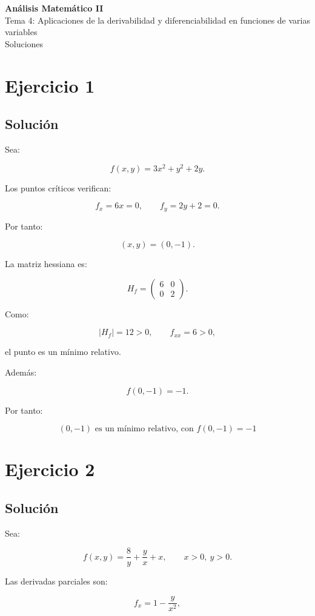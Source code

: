 \documentclass[11pt,a4paper]{article}
\begin{document}
\begin{center}
{\LARGE\bfseries Análisis Matemático II}\\[0.4em]
{\Large Tema 4: Aplicaciones de la derivabilidad y diferenciabilidad en funciones de varias variables}\\[0.4em]
{\large Soluciones}
\end{center}

\section{Ejercicio 1}
\subsection{Solución}

Sea:

\[
f(x,y)=3x^2+y^2+2y.
\]

Los puntos críticos verifican:

\[
f_x=6x=0,
\qquad
f_y=2y+2=0.
\]

Por tanto:

\[
(x,y)=(0,-1).
\]

La matriz hessiana es:

\[
H_f=
\begin{pmatrix}
6&0\\
0&2
\end{pmatrix}.
\]

Como:

\[
|H_f|=12>0,
\qquad
f_{xx}=6>0,
\]

el punto es un mínimo relativo.

Además:

\[
f(0,-1)=-1.
\]

Por tanto:

\[
\boxed{
(0,-1)\text{ es un mínimo relativo, con }f(0,-1)=-1
}
\]

\section{Ejercicio 2}
\subsection{Solución}

Sea:

\[
f(x,y)=\frac8y+\frac yx+x,
\qquad
x>0,\ y>0.
\]

Las derivadas parciales son:

\[
f_x=1-\frac{y}{x^2},
\]
\end{document}
